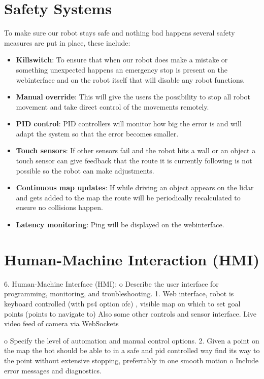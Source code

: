 \documentclass[a4paper]{article}
\begin{document}
\section*{Safety Systems}
To make sure our robot stays safe and nothing bad happens several safety measures are put in place, these include:
\begin{itemize}
    \item \textbf{Killswitch}: To ensure that when our robot does make a mistake or something unexpected happens an emergency stop is present on the webinterface and on the robot itself that will disable any robot functions.
    \item \textbf{Manual override}: This will give the users the possibility to stop all robot movement and take direct control of the movements remotely.
    \item \textbf{PID control}: PID controllers will monitor how big the error is and will adapt the system so that the error becomes smaller.
    \item \textbf{Touch sensors}: If other sensors fail and the robot hits a wall or an object a touch sensor can give feedback that the route it is currently following is not possible so the robot can make adjustments.
    \item \textbf{Continuous map updates}: If while driving an object appears on the lidar and gets added to the map the route will be periodically recalculated to ensure no collisions happen.
    \item \textbf{Latency monitoring}: Ping will be displayed on the webinterface.
\end{itemize}


\section*{Human-Machine Interaction (HMI)}
6.	Human-Machine Interface (HMI):
o	Describe the user interface for programming, monitoring, and troubleshooting.
1. Web interface, robot is keyboard controlled (with ps4 option ofc) , 		visible map on which to set goal points (points to navigate to)
Also some other controls and sensor interface. Live video feed of 		camera via WebSockets 	

o	Specify the level of automation and manual control options.
2. Given a point on the map the bot should be able to in a safe and pid controlled way find its way to the point without extensive stopping, preferrably in one smooth motion
o	Include error messages and diagnostics.
\end{document}
